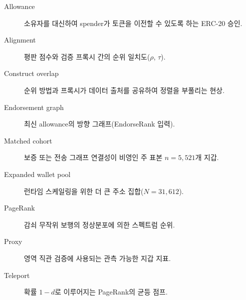 \begin{description}
\item[Allowance] 소유자를 대신하여 spender가 토큰을 이전할 수 있도록 하는 ERC-20 승인.
\item[Alignment] 평판 점수와 검증 프록시 간의 순위 일치도($\rho$, $\tau$).
\item[Construct overlap] 순위 방법과 프록시가 데이터 출처를 공유하여 정렬을 부풀리는 현상.
\item[Endorsement graph] 최신 allowance의 방향 그래프(EndorseRank 입력).
\item[Matched cohort] 보증 또는 전송 그래프 연결성이 비영인 주 표본 $n=5{,}521$개 지갑.
\item[Expanded wallet pool] 런타임 스케일링을 위한 더 큰 주소 집합($N=31{,}612$).
\item[PageRank] 감쇠 무작위 보행의 정상분포에 의한 스펙트럼 순위.
\item[Proxy] 영역 직관 검증에 사용되는 관측 가능한 지갑 지표.
\item[Teleport] 확률 $1-d$로 이루어지는 PageRank의 균등 점프.
\end{description}





